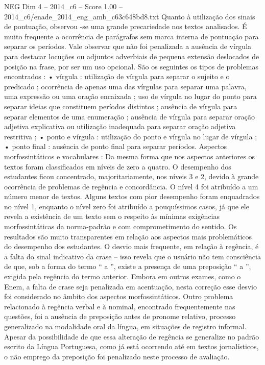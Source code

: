\begin{textsample}{NEG Dim 4 – 2014\_c6 – Score 1.00 – 2014\_c6/enade\_2014\_eng\_amb\_c63c648bd8.txt}
Quanto à utilização dos sinais de pontuação, observou -se uma grande precariedade nos textos analisados.
É muito frequente a ocorrência de parágrafos sem marca interna de pontuação para separar os períodos.
Vale observar que não foi penalizada a ausência de vírgula para destacar locuções ou adjuntos adverbiais de pequena extensão deslocados de posição na frase, por ser um uso opcional.
São os seguintes os tipos de problemas encontrados : • vírgula : utilização de vírgula para separar o sujeito e o predicado ; ocorrência de apenas uma das vírgulas para separar uma palavra, uma expressão ou uma oração encaixada ; uso de vírgula no lugar do ponto para separar ideias que constituem períodos distintos ; ausência de vírgula para separar elementos de uma enumeração ; ausência de vírgula para separar oração adjetiva explicativa ou utilização inadequada para separar oração adjetiva restritiva ; • ponto e vírgula : utilização do ponto e vírgula no lugar de vírgula ; • ponto final : ausência de ponto final para separar períodos.
Aspectos morfossintáticos e vocabulares : Da mesma forma que nos aspectos anteriores os textos foram classificados em níveis de zero a quatro.
O desempenho dos estudantes ficou concentrado, majoritariamente, nos níveis 3 e 2, devido à grande ocorrência de problemas de regência e concordância.
O nível 4 foi atribuído a um número menor de textos.
Alguns textos com pior desempenho foram enquadrados no nível 1, enquanto o nível zero foi atribuído a pouquíssimos casos, já que ele revela a existência de um texto sem o respeito às mínimas exigências morfossintáticas da norma-padrão e com comprometimento do sentido.
Os resultados são muito transparentes em relação aos aspectos mais problemáticos do desempenho dos estudantes.
O desvio mais frequente, em relação à regência, é a falta do sinal indicativo da crase – isso revela que o usuário não tem consciência de que, sob a forma do termo “ a ”, existe a presença de uma preposição “ a ”, exigida pela regência do termo anterior.
Embora em outros exames, como o Enem, a falta de crase seja penalizada em acentuação, nesta correção esse desvio foi considerado no âmbito dos aspectos morfossintáticos.
Outro problema relacionado à regência verbal e à nominal, encontrado frequentemente nas questões, foi a ausência de preposição antes de pronome relativo, processo generalizado na modalidade oral da língua, em situações de registro informal.
Apesar da possibilidade de que essa alteração de regência se generalize no padrão escrito da Língua Portuguesa, como já está ocorrendo até em textos jornalísticos, o não emprego da preposição foi penalizado neste processo de avaliação.

\end{textsample}
